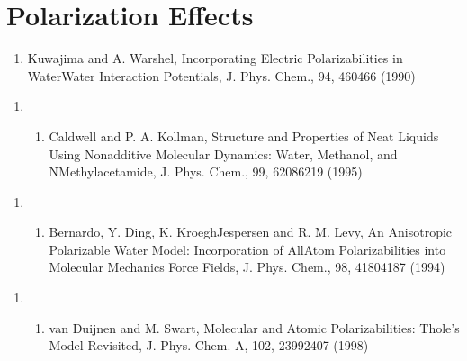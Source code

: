 \documentclass[letterpaper,11pt,english]{sphinxmanual}
\begin{document}
\section{Polarization Effects}
\label{\detokenize{text/references:polarization-effects}}\begin{enumerate}
%
\setcounter{enumi}{18}
\item {} 
Kuwajima and A. Warshel, Incorporating Electric Polarizabilities in Water\sphinxhyphen{}Water Interaction Potentials, J. Phys. Chem., 94, 460\sphinxhyphen{}466 (1990)

\end{enumerate}
\begin{enumerate}
%
\setcounter{enumi}{9}
\item {} \begin{enumerate}
%
\setcounter{enumii}{22}
\item {} 
Caldwell and P. A. Kollman, Structure and Properties of Neat Liquids Using Nonadditive Molecular Dynamics: Water, Methanol, and N\sphinxhyphen{}Methylacetamide, J. Phys. Chem., 99, 6208\sphinxhyphen{}6219 (1995)

\end{enumerate}

\end{enumerate}
\begin{enumerate}
%
\setcounter{enumi}{3}
\item {} \begin{enumerate}
%
\setcounter{enumii}{13}
\item {} 
Bernardo, Y. Ding, K. Kroegh\sphinxhyphen{}Jespersen and R. M. Levy, An Anisotropic Polarizable Water Model: Incorporation of All\sphinxhyphen{}Atom Polarizabilities into Molecular Mechanics Force Fields, J. Phys. Chem., 98, 4180\sphinxhyphen{}4187 (1994)

\end{enumerate}

\end{enumerate}
\begin{enumerate}
%
\setcounter{enumi}{15}
\item {} \begin{enumerate}
%
\setcounter{enumii}{19}
\item {} 
van Duijnen and M. Swart, Molecular and Atomic Polarizabilities: Thole’s Model Revisited, J. Phys. Chem. A, 102, 2399\sphinxhyphen{}2407 (1998)

\end{enumerate}

\end{enumerate}
\end{document}
